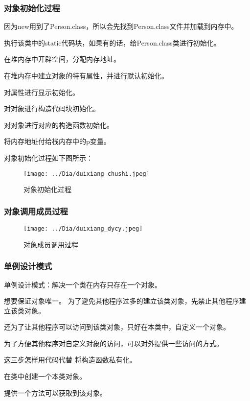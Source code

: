 \documentclass[UTF8]{ctexart}
\begin{document}
\subsubsection{对象初始化过程}

\textbullet 因为new用到了Person.class，所以会先找到Person.class文件并加载到内存中。

\textbullet 执行该类中的static代码块，如果有的话，给Person.class类进行初始化。

\textbullet 在堆内存中开辟空间，分配内存地址。

\textbullet 在堆内存中建立对象的特有属性，并进行默认初始化。

\textbullet 对属性进行显示初始化。

\textbullet 对对象进行构造代码块初始化。

\textbullet 对对象进行对应的构造函数初始化。

\textbullet 将内存地址付给栈内存中的p变量。

对象初始化过程如下图所示：
\begin{figure}[ht]
\centering
\texttt{[image: ../Dia/duixiang\_chushi.jpeg]}
\caption{对象初始化过程}
\end{figure}


\subsubsection{对象调用成员过程}
\begin{figure}[ht]
\centering
\texttt{[image: ../Dia/duixiang\_dycy.jpeg]}
\caption{对象成员调用过程}
\end{figure}
\subsubsection{单例设计模式}

单例设计模式：解决一个类在内存只存在一个对象。

想要保证对象唯一。
\textbullet 为了避免其他程序过多的建立该类对象，先禁止其他程序建立该类对象。

\textbullet 还为了让其他程序可以访问到该类对象，只好在本类中，自定义一个对象。

\textbullet 为了方便其他程序对自定义对象的访问，可以对外提供一些访问的方式。

这三步怎样用代码代替
\textbullet 将构造函数私有化。

\textbullet 在类中创建一个本类对象。

\textbullet 提供一个方法可以获取到该对象。
\end{document}
